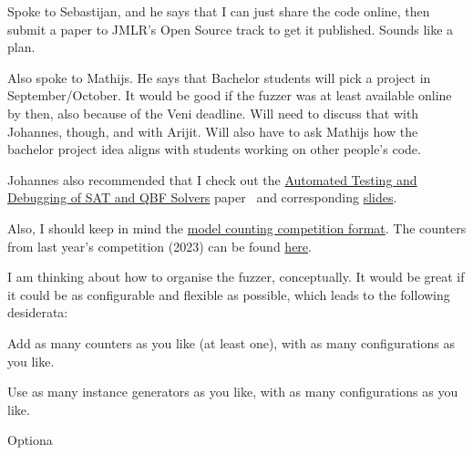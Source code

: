 \documentclass[a4paper]{tufte-handout}
\begin{document}
	Spoke to Sebastijan, and he says that I can just share the code online, then submit a paper to JMLR's Open Source track to get it published. Sounds like a plan.

	Also spoke to Mathijs. He says that Bachelor students will pick a project in September/October. It would be good if the fuzzer was at least available online by then, also because of the Veni deadline. Will need to discuss that with Johannes, though, and with Arijit. Will also have to ask Mathijs how the bachelor project idea aligns with students working on other people's code.
	
	Johannes also recommended that I check out the \href{https://cca.informatik.uni-freiburg.de/papers/BrummayerLonsingBiere-SAT10.pdf}{Automated Testing and Debugging of SAT and QBF Solvers} paper~\cite{BLB2010} and corresponding \href{https://fmv.jku.at/brummayer/talks/Brummayer-SAT10-talk.pdf}{slides}.

	Also, I should keep in mind the \href{https://mccompetition.org/assets/files/mccomp_format_24.pdf}{model counting competition format}.
	The counters from last year's competition (2023) can be found \href{https://owncloud.tuwien.ac.at/index.php/s/0ieuZHrL498MPjm}{here}.

	\noindent\hrulefill
		
	
	
	I am thinking about how to organise the fuzzer, conceptually. It would be great if it could be as configurable and flexible as possible, which leads to the following desiderata:

	\begin{compactenum}
		\item Add as many counters as you like (at least one), with as many configurations as you like.
		\item Use as many instance generators as you like, with as many configurations as you like.
		\item Optiona
	\end{compactenum}
\end{document}
